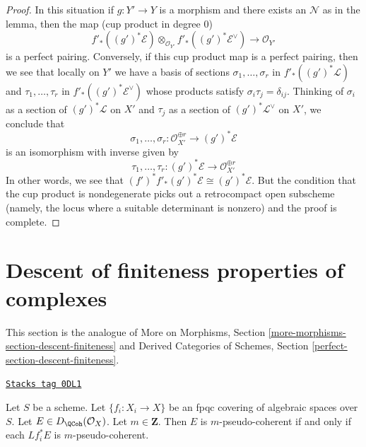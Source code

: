 \begin{proof}
\medskip\noindent
In this situation if $g : Y' \to Y$ is a morphism and there exists an
$\mathcal{N}$ as in the lemma, then the map (cup product in degree $0$)
$$
f'_*((g')^*\mathcal{E})
\otimes_{\mathcal{O}_{Y'}}
f'_*((g')^*\mathcal{E}^\vee)
\longrightarrow \mathcal{O}_{Y'}
$$
is a perfect pairing. Conversely, if this cup product map is a
perfect pairing, then we see that locally on $Y'$ we have
a basis of sections
$\sigma_1, \ldots, \sigma_r$ in $f'_*((g')^*\mathcal{L})$ and
$\tau_1, \ldots, \tau_r$ in
$f'_*((g')^*\mathcal{E}^\vee)$ whose products satisfy
$\sigma_i \tau_j = \delta_{ij}$. Thinking of $\sigma_i$
as a section of $(g')^*\mathcal{L}$ on $X'$
and $\tau_j$ as a section of $(g')^*\mathcal{L}^\vee$ on $X'$,
we conclude that
$$
\sigma_1, \ldots, \sigma_r :
\mathcal{O}_{X'}^{\oplus r}
\longrightarrow
(g')^*\mathcal{E}
$$
is an isomorphism with inverse given by
$$
\tau_1, \ldots, \tau_r :
(g')^*\mathcal{E}
\longrightarrow
\mathcal{O}_{X'}^{\oplus r}
$$
In other words, we see that
$(f')^*f'_*(g')^*\mathcal{E} \cong (g')^*\mathcal{E}$.
But the condition that the cup product is nondegenerate
picks out a retrocompact open subscheme (namely, the locus where a suitable
determinant is nonzero) and the proof is complete.
\end{proof}

\section{Descent of finiteness properties of complexes}
\label{spaces-more-morphisms-section-descent-finiteness}
This section is the analogue of More on Morphisms,
Section \ref{more-morphisms-section-descent-finiteness}
and
Derived Categories of Schemes, Section
\ref{perfect-section-descent-finiteness}.

\begin{lemma}
\label{spaces-more-morphisms-lemma-pseudo-coherent-descends-fpqc}
\href{https://stacks.math.columbia.edu/tag/0DL1}{\texttt{Stacks tag 0DL1}}

Let $S$ be a scheme. Let $\{f_i : X_i \to X\}$ be an fpqc covering of
algebraic spaces over $S$. Let $E \in D_\QCoh(\mathcal{O}_X)$.
Let $m \in \mathbf{Z}$. Then $E$ is $m$-pseudo-coherent if and only if each
$Lf_i^*E$ is $m$-pseudo-coherent.
\end{lemma}

